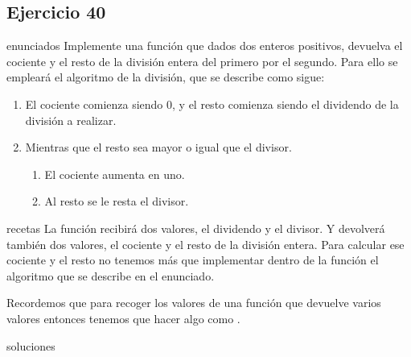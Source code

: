 \subsection{Ejercicio 40}
\def\parte{enunciados}
\ifx\capitulo\parte
Implemente una función que dados dos enteros positivos, devuelva el cociente y el resto de la división entera del primero por el segundo. Para ello se empleará el algoritmo de la división, que se describe como sigue:
\begin{enumerate}
\item El cociente comienza siendo 0, y el resto comienza siendo el dividendo de la división a realizar.
\item Mientras que el resto sea mayor o igual que el divisor.
  \begin{enumerate}
  \item El cociente aumenta en uno.
  \item Al resto se le resta el divisor.
  \end{enumerate}
\end{enumerate}
\fi

\def\parte{recetas}
\ifx\capitulo\parte
La función recibirá dos valores, el dividendo y el divisor. Y devolverá también dos valores, el cociente y el resto de la división entera. Para calcular ese cociente y el resto no tenemos más que implementar dentro de la función el algoritmo que se describe en el enunciado.

Recordemos que para recoger los valores de una función que devuelve varios valores entonces tenemos que hacer algo como .
\fi

\def\parte{soluciones}
\ifx\capitulo\parte

\fi

